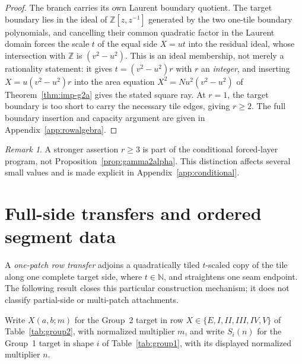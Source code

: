 \documentclass[11pt]{amsart}
\theoremstyle{definition}
\theoremstyle{remark}
\newtheorem{remark}[theorem]{Remark}
\newcommand{\Z}{\mathbb Z}
\newcommand{\N}{\mathbb N}
\begin{document}
\begin{proof}
The branch carries its own Laurent boundary quotient.  The target boundary
lies in the ideal of $\Z[z,z^{-1}]$ generated by the two one-tile boundary
polynomials, and cancelling their common quadratic factor in the Laurent
domain forces the scale $t$ of the equal side $X=ut$ into the residual
ideal, whose intersection with $\Z$ is $(v^2-u^2)$.  This is an ideal
membership, not merely a rationality statement: it gives $t=(v^2-u^2)r$
with $r$ an \emph{integer}, and inserting $X=u(v^2-u^2)r$ into the area
equation $X^2=Nu^2(v^2-u^2)$ of Theorem~\ref{thm:imp-g2a} gives the stated
square ray.  At $r=1$, the target boundary is too short to carry
the necessary tile edges, giving $r\ge2$.  The full boundary insertion and
capacity argument are given in Appendix~\ref{app:rowalgebra}.
\end{proof}

\begin{remark}
A stronger assertion $r\ge3$ is part of the conditional forced-layer program,
not Proposition~\ref{prop:gamma2alpha}.  This distinction affects several
small values and is made explicit in Appendix~\ref{app:conditional}.
\end{remark}

\section{Full-side transfers and ordered segment data}\label{sec:seams}

A \emph{one-patch row transfer} adjoins a quadratically tiled
$t$-scaled copy of the tile along one complete target side, where
$t\in\N$, and straightens one seam endpoint.  The following result closes
this particular construction mechanism; it does not classify partial-side
or multi-patch attachments.

Write $X(a,b;m)$ for the Group~2 target in row
$X\in\{E,I,II,III,IV,V\}$ of Table~\ref{tab:group2}, with normalized
multiplier $m$, and write $S_i(n)$ for the Group~1 target in shape $i$ of
Table~\ref{tab:group1}, with its displayed normalized multiplier $n$.
\end{document}
